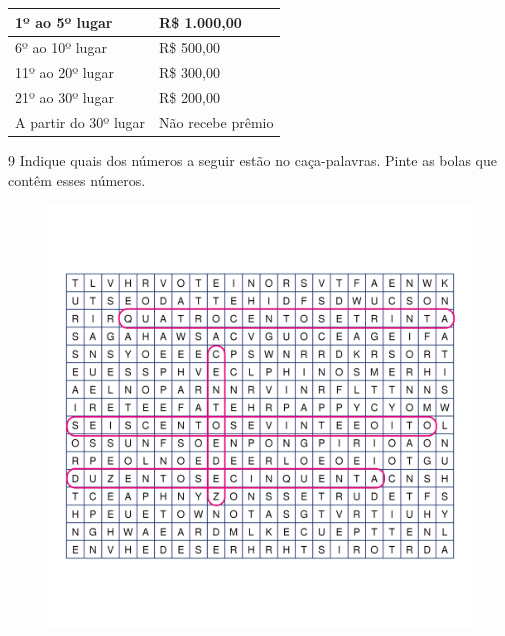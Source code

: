 \begin{table}[htpb!]
\begin{center}
\begin{tabular}{|l|l|}
\hline
1º ao 5º lugar        & R\$ 1.000,00      \\ \hline
6º ao 10º lugar       & R\$ 500,00        \\ \hline
11º ao 20º lugar      & R\$ 300,00        \\ \hline
21º ao 30º lugar      & R\$ 200,00        \\ \hline
A partir do 30º lugar & Não recebe prêmio \\ \hline
\end{tabular}
\end{center}
\end{table}

\vspace*{-2em}


\pagebreak
\num{9} Indique quais dos números a seguir estão no caça-palavras. Pinte
as bolas que contêm esses números.

\begin{figure}[htpb!]
\includegraphics[width=\textwidth]{./media/image11_prof.png}
\end{figure}

